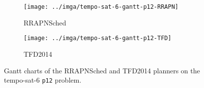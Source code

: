 \begin{figure}[tbp]
\centering
\begin{subfigure}{\textwidth}
\centering
\texttt{[image: ../imga/tempo-sat-6-gantt-p12-RRAPN]}
\caption{RRAPNSched}
\label{fig:tempo-sat-6-gantt-12-rrapn}
\end{subfigure}

\begin{subfigure}{\textwidth}
\vspace{0.5cm}
\centering
\texttt{[image: ../imga/tempo-sat-6-gantt-p12-TFD]}
\caption{TFD2014}
\label{fig:tempo-sat-6-gantt-12-tfd}
\end{subfigure}
\caption{Gantt charts of the RRAPNSched and TFD2014 planners on the tempo-sat-6 \texttt{p12} problem.}
\label{fig:tempo-sat-6-gantt}
\end{figure}

